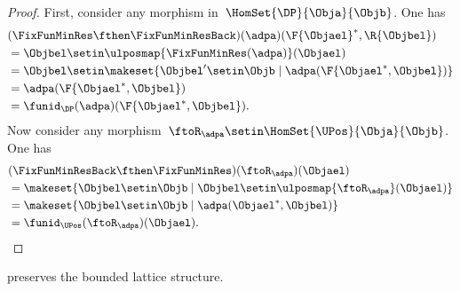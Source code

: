 \begin{proof}
    First, consider any morphism in~$\HomSet{\DP}{\Obja}{\Objb}$.
    One has
    \begin{equation*}
        \begin{aligned}
             & (\FixFunMinRes \fthen \FixFunMinResBack)(\adpa)(\F{\Objael}^*,\R{\Objbel}) \\
             & = \Objbel \setin \ulposmap{\FixFunMinRes(\adpa)}(\Objael) \\
             & =\Objbel \setin \makeset{ \Objbel' \setin \Objb \mid \adpa(\F{\Objael^*,\Objbel})} \\
             & =\adpa(\F{\Objael^*,\Objbel}) \\
             & =\funid_\DP(\adpa)(\F{\Objael^*,\Objbel}).
        \end{aligned}
    \end{equation*}
    Now consider any morphism~$\ftoR_\adpa \setin \HomSet{\UPos}{\Obja}{\Objb}$.
    One has
    \begin{equation*}
        \begin{aligned}
             & (\FixFunMinResBack \fthen \FixFunMinRes)(\ftoR_\adpa)(\Objael) \\
             & =\makeset{ \Objbel \setin \Objb\mid \Objbel \setin \ulposmap{\ftoR_\adpa}(\Objael)} \\
             & =\makeset{ \Objbel \setin \Objb\mid \adpa(\Objael^*,\Objbel)} \\
             & =\funid_\UPos(\ftoR_\adpa)(\Objael).
        \end{aligned}
    \end{equation*}

\end{proof}
\begin{lemma}
    \FixFunMinRes preserves the bounded lattice structure.
\end{lemma}
